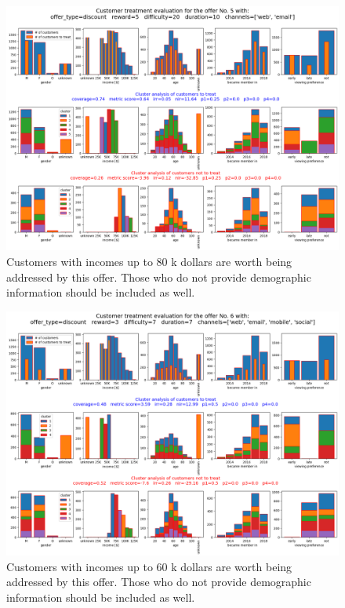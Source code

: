 \documentclass[11pt]{article} %
\begin{document}
\begin{figure}[H]
\includegraphics[height=0.5\textheight]{results/results5.png}
\caption{Customers with  incomes up to 80 k dollars are worth being addressed by this offer. Those who do not provide demographic information should be included as well.}
\end{figure}
\begin{figure}[H]
\includegraphics[height=0.5\textheight]{results/results6.png}
\caption{Customers with  incomes up to 60 k dollars are worth being addressed by this offer. Those who do not provide demographic information should be included as well.}
\end{figure}
\end{document}
